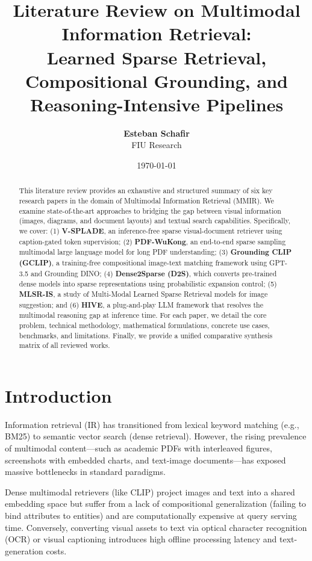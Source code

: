 \documentclass[11pt,a4paper]{article}
\title{\textbf{Literature Review on Multimodal Information Retrieval:\\Learned Sparse Retrieval, Compositional Grounding, and Reasoning-Intensive Pipelines}}
\author{\textbf{Esteban Schafir} \\ FIU Research}
\date{\today}
\begin{document}
\maketitle

\begin{abstract}
This literature review provides an exhaustive and structured summary of six key research papers in the domain of Multimodal Information Retrieval (MMIR). We examine state-of-the-art approaches to bridging the gap between visual information (images, diagrams, and document layouts) and textual search capabilities. Specifically, we cover: (1) \textbf{V-SPLADE}, an inference-free sparse visual-document retriever using caption-gated token supervision; (2) \textbf{PDF-WuKong}, an end-to-end sparse sampling multimodal large language model for long PDF understanding; (3) \textbf{Grounding CLIP (GCLIP)}, a training-free compositional image-text matching framework using GPT-3.5 and Grounding DINO; (4) \textbf{Dense2Sparse (D2S)}, which converts pre-trained dense models into sparse representations using probabilistic expansion control; (5) \textbf{MLSR-IS}, a study of Multi-Modal Learned Sparse Retrieval models for image suggestion; and (6) \textbf{HIVE}, a plug-and-play LLM framework that resolves the multimodal reasoning gap at inference time. For each paper, we detail the core problem, technical methodology, mathematical formulations, concrete use cases, benchmarks, and limitations. Finally, we provide a unified comparative synthesis matrix of all reviewed works.
\end{abstract}

\newpage
\tableofcontents
\newpage

\section{Introduction}
Information retrieval (IR) has transitioned from lexical keyword matching (e.g., BM25) to semantic vector search (dense retrieval). However, the rising prevalence of multimodal content---such as academic PDFs with interleaved figures, screenshots with embedded charts, and text-image documents---has exposed massive bottlenecks in standard paradigms. 

Dense multimodal retrievers (like CLIP) project images and text into a shared embedding space but suffer from a lack of compositional generalization (failing to bind attributes to entities) and are computationally expensive at query serving time. Conversely, converting visual assets to text via optical character recognition (OCR) or visual captioning introduces high offline processing latency and text-generation costs. 
\end{document}
